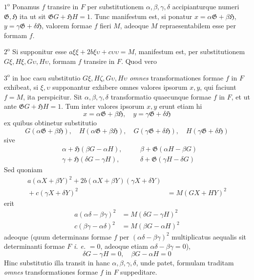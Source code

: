 $1^{\mathrm{o}}$ Ponamus $f$ transire in $F$ per substitutionem $\alpha,\beta,\gamma,\delta$ accipianturque numeri $\mathfrak{G},\mathfrak{H}$ ita ut sit $\mathfrak{G}G+\mathfrak{H}H=1$. Tunc manifestum est, si ponatur $x=\alpha\mathfrak{G}+\beta\mathfrak{H}$, $y=\gamma\mathfrak{G}+\delta\mathfrak{H}$, valorem formae $f$ fieri $M$, adeoque $M$ repraesentabilem esse per formam $f$.

$2^{\mathrm{o}}$ Si supponitur esse $a\xi\xi+2b\xi\upsilon+c\upsilon\upsilon=M$, manifestum est, per substitutionem $G\xi,H\xi,G\upsilon,H\upsilon$, formam $f$ transire in $F$. Quod vero

$3^{\mathrm{o}}$ in hoc casu substitutio $G\xi,H\zeta,G\upsilon,H\upsilon$ \textit{omnes} transformationes formae $f$ in $F$ exhibeat, si $\xi,\upsilon$ supponantur exhibere omnes valores ipsorum $x,y$, qui faciunt $f=M$, ita perspicitur. Sit $\alpha,\beta,\gamma,\delta$ transformatio quaecunque formae $f$ in $F$, et ut ante $\mathfrak{G}G+\mathfrak{H}H=1$. Tum inter valores ipsorum $x,y$ erunt etiam hi
\[
x=\alpha\mathfrak{G}+\beta\mathfrak{H},\quad y=\gamma\mathfrak{G}+\delta\mathfrak{H}
\]
ex quibus obtinetur substitutio
\[
G(\alpha\mathfrak{G}+\beta\mathfrak{H}),\quad H(\alpha\mathfrak{G}+\beta\mathfrak{H}),\quad G(\gamma\mathfrak{G}+\delta\mathfrak{H}),\quad H(\gamma\mathfrak{G}+\delta\mathfrak{H})
\]
sive
\[
\begin{aligned}
&\alpha+\mathfrak{H}(\beta G-\alpha H), &\quad&\beta+\mathfrak{G}(\alpha H-\beta G)\\
&\gamma+\mathfrak{H}(\delta G-\gamma H), &&\delta+\mathfrak{G}(\gamma H-\delta G)
\end{aligned}
\]
Sed quoniam
\[
\begin{aligned}a(\alpha X+\beta Y)^2+2b(\alpha X+\beta Y)(\gamma X+\delta Y)&{}\\
{}+c(\gamma X+\delta Y)^2&=M(GX+HY)^2\end{aligned}
\]
erit
\[
\begin{aligned}
a(\alpha\delta-\beta\gamma)^2&=M(\delta G-\gamma H)^2\\
c(\beta\gamma-\alpha\delta)^2&=M(\beta G-\alpha H)^2
\end{aligned}
\]
adeoque (quum determinans formae $f$ per $(\alpha\delta-\beta\gamma)^2$ multiplicatus aequalis sit determinanti formae $F$ \textit{i. e.} $=0$, adeoque etiam $\alpha\delta-\beta\gamma=0$),
\[
\delta G-\gamma H=0,\quad \beta G-\alpha H=0
\]
Hinc substitutio illa transit in hanc $\alpha,\beta,\gamma,\delta$, unde patet, formulam traditam \textit{omnes} transformationes formae $f$ in $F$ suppeditare.

